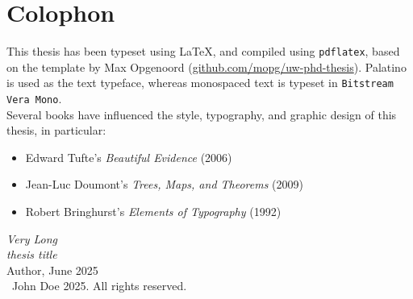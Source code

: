 {%
\thispagestyle{empty}%
\SingleSpacing%
\small%
\vfill%
%
\section*{Colophon}
\noindent This thesis has been typeset using \LaTeX{}, and compiled using \texttt{pdflatex}, based on the template by Max Opgenoord (\href{https://github.com/mopg/uw-phd-thesis}{github.com/mopg/uw-phd-thesis}).
Palatino is used as the text typeface, %
whereas monospaced text is typeset in \texttt{Bitstream Vera Mono}.
\mbox{}\vspace{0.5pc}\\
\noindent Several books have influenced the style, typography, and graphic design of this thesis, in particular:
\begin{itemize}
  \item[] Edward Tufte's \textit{Beautiful Evidence} (2006)
  \item[] Jean-Luc Doumont's \textit{Trees, Maps, and Theorems} (2009)
  \item[] Robert Bringhurst's \textit{Elements of Typography} (1992)
\end{itemize}
\vspace{0.75pc}%

{\SingleSpacing\noindent\textit{Very Long }\\
\textit{thesis title}\vspace{0.25pc}\\}
Author, June 2025 \vspace{1.25pc}\\
\noindent \textcopyright\ John Doe 2025. All rights reserved.\vspace{1pc} \\
}
